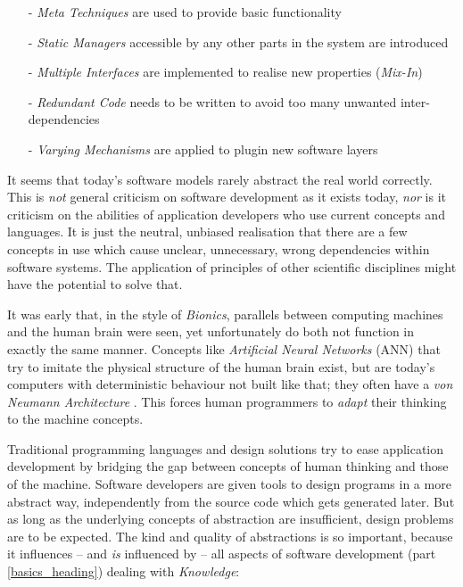 \begin{itemize}
    \item[-] \emph{Meta Techniques} are used to provide basic functionality
    \item[-] \emph{Static Managers} accessible by any other parts in the system
        are introduced
    \item[-] \emph{Multiple Interfaces} are implemented to realise new
        properties (\emph{Mix-In})
    \item[-] \emph{Redundant Code} needs to be written to avoid too many
        unwanted inter-dependencies
    \item[-] \emph{Varying Mechanisms} are applied to plugin new software layers
\end{itemize}

It seems that today's software models rarely abstract the real world correctly.
This is \emph{not} general criticism on software development as it exists today,
\emph{nor} is it criticism on the abilities of application developers who use
current concepts and languages. It is just the neutral, unbiased realisation
that there are a few concepts in use which cause unclear, unnecessary, wrong
dependencies within software systems. The application of principles of other
scientific disciplines might have the potential to solve that.

It was early that, in the style of \emph{Bionics}, parallels between computing
machines and the human brain were seen, yet unfortunately do both not function
in exactly the same manner. Concepts like \emph{Artificial Neural Networks} (ANN)
that try to imitate the
physical structure of the human brain exist, but are today's computers with
deterministic behaviour not built like that; they often have a
\emph{von Neumann Architecture} \cite{philippow}. This forces human programmers
to \emph{adapt} their thinking to the machine concepts.

Traditional programming languages and design solutions try to ease application
development by bridging the gap between concepts of human thinking and those of
the machine. Software developers are given tools to design programs in a more
abstract way, independently from the source code which gets generated later.
But as long as the underlying concepts of abstraction are insufficient, design
problems are to be expected. The kind and quality of abstractions is so
important, because it influences -- and \emph{is} influenced by -- all aspects
of software development (part \ref{basics_heading}) dealing with
\emph{Knowledge}:

